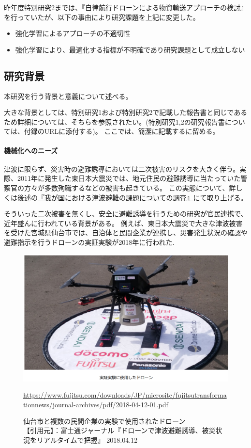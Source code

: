 \documentclass{article}[jsarticle]
\begin{document}
昨年度特別研究2までは、『自律航行ドローンによる物資輸送アプローチの検討』を行っていたが、以下の事由により研究課題を上記に変更した。
\begin{itemize}
    \item 強化学習によるアプローチの不適切性
    \item 強化学習により、最適化する指標が不明確であり研究課題として成立しない
\end{itemize}

\subsection{研究背景}
本研究を行う背景と意義について述べる。\par 
大きな背景としては、特別研究1および特別研究2で記載した報告書と同じであるため詳細については、そちらを参照されたい。(特別研究1,2の研究報告書については、付録のURLに添付する)。
ここでは、簡潔に記載するに留める。\par

\paragraph{機械化へのニーズ}
津波に限らず、災害時の避難誘導においては二次被害のリスクを大きく伴う。実際、2011年に発生した東日本大震災では、地元住民の避難誘導に当たっていた警察官の方々が多数殉職するなどの被害も起きている。
この実態について、詳しくは後述の\hyperref[sec:research-sec1]{『我が国における津波避難の課題についての調査』}にて取り上げる。 \par
そういった二次被害を無くし、安全に避難誘導を行うための研究が官民連携で、近年盛んに行われている背景がある。
例えば、東日本大震災で大きな津波被害を受けた宮城県仙台市では、自治体と民間企業が連携し、災害発生状況の確認や避難指示を行うドローンの実証実験が2018年に行われた.
\begin{figure}[H]
    \centering
    \includegraphics[scale=0.5]{./images/drone1.png}
    \caption{
       仙台市と複数の民間企業の実験で使用されたドローン \\
    【引用元】：富士通ジャーナル『ドローンで津波避難誘導、被災状況をリアルタイムで把握』 2018.04.12 \\
    }
    \url{https://www.fujitsu.com/downloads/JP/microsite/fujitsutransformationnews/journal-archives/pdf/2018-04-12-01.pdf}
\end{figure}
\end{document}
